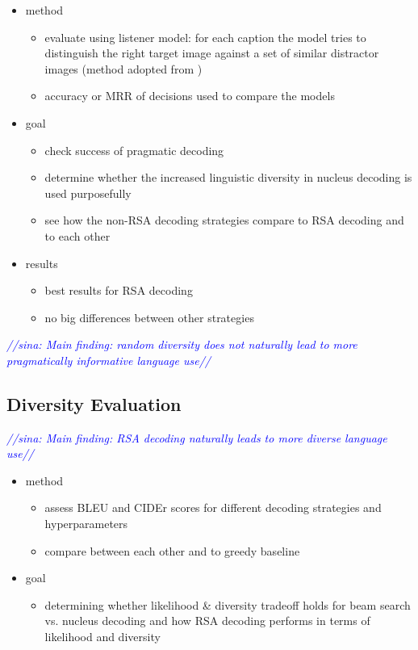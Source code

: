 \documentclass[11pt,a4paper]{article}
\newcommand{\sina}[1]{\textcolor{blue}{\emph{//sina: #1//}}}
\begin{document}
\begin{itemize}

\item method
	\begin{itemize}
	\item evaluate using listener model: for each caption the model tries to distinguish the right target image against a set of similar distractor images (method adopted from \citet{Cohn-Gordon2018})
	\item accuracy or MRR of decisions used to compare the models
	\end{itemize}

\item goal
	\begin{itemize}
	\item check success of pragmatic decoding	
	\item determine whether the increased linguistic diversity in nucleus decoding is used purposefully
	\item see how the non-RSA decoding strategies compare to RSA decoding and to each other
	\end{itemize}

\item results
	\begin{itemize}
	\item best results for RSA decoding
	\item no big differences between other strategies
	\end{itemize}

\end{itemize}

\sina{Main finding: random diversity does not naturally lead to more pragmatically informative language use}

\subsection{Diversity Evaluation}

\sina{Main finding: RSA decoding naturally leads to more diverse language use}


\begin{itemize}
\item method
	\begin{itemize}
	\item assess BLEU and CIDEr scores for different decoding strategies and hyperparameters
	\item compare between each other and to greedy baseline
	\end{itemize}
\item goal
	\begin{itemize}
	\item determining whether likelihood \& diversity tradeoff holds for beam search vs. nucleus decoding and how RSA decoding performs in terms of likelihood and diversity
	\end{itemize}
\end{itemize}
\end{document}
